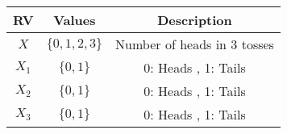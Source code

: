 
\begin{center}
\begin{tabular}{|c|c|c|}
\hline
\textbf{RV}& \textbf{Values} & \textbf{Description} \\ \hline
$X$		   & 	$\{0,1,2,3\}$	&   Number of heads in 3 tosses\\ \hline
$X_1$		   & 	$\{0,1\}$	&   0: Heads , 1: Tails\\ \hline
$X_2$ 		   & 	$\{0,1\}$	&	0: Heads , 1: Tails\\ \hline
$X_3$		   & 	$\{0,1\}$	&   0: Heads , 1: Tails\\ \hline
\end{tabular}
\end{center}

